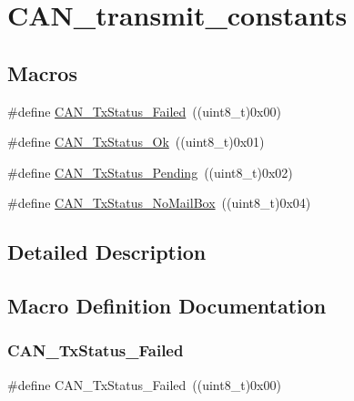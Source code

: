 \hypertarget{group___c_a_n__transmit__constants}{}\section{C\+A\+N\+\_\+transmit\+\_\+constants}
\label{group___c_a_n__transmit__constants}
\subsection*{Macros}
\begin{DoxyCompactItemize}
\item 
\#define \mbox{\hyperlink{group___c_a_n__transmit__constants_ga8d193002e76c04ec8caff6b110cd5983}{C\+A\+N\+\_\+\+Tx\+Status\+\_\+\+Failed}}~((uint8\+\_\+t)0x00)
\item 
\#define \mbox{\hyperlink{group___c_a_n__transmit__constants_ga0b401c61922b1449de9b486dcf475c97}{C\+A\+N\+\_\+\+Tx\+Status\+\_\+\+Ok}}~((uint8\+\_\+t)0x01)
\item 
\#define \mbox{\hyperlink{group___c_a_n__transmit__constants_ga9678a3a51379422868083608c7394409}{C\+A\+N\+\_\+\+Tx\+Status\+\_\+\+Pending}}~((uint8\+\_\+t)0x02)
\item 
\#define \mbox{\hyperlink{group___c_a_n__transmit__constants_ga2620e99debd51011d3569121f2e44690}{C\+A\+N\+\_\+\+Tx\+Status\+\_\+\+No\+Mail\+Box}}~((uint8\+\_\+t)0x04)
\end{DoxyCompactItemize}


\subsection{Detailed Description}


\subsection{Macro Definition Documentation}
\mbox{\label{group___c_a_n__transmit__constants_ga8d193002e76c04ec8caff6b110cd5983}} 
\subsubsection{\texorpdfstring{CAN\_TxStatus\_Failed}{CAN\_TxStatus\_Failed}}
{\footnotesize\ttfamily \#define C\+A\+N\+\_\+\+Tx\+Status\+\_\+\+Failed~((uint8\+\_\+t)0x00)}

